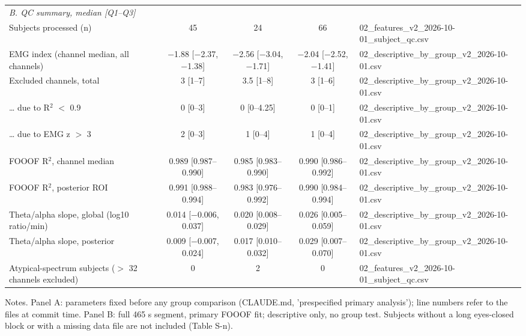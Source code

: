 \begin{table}[htbp]
{\begin{tabular}{p{3.2cm}p{6.5cm}cccl}
\midrule
\multicolumn{6}{l}{\textit{B. QC summary, median [Q1--Q3]}} \\
Subjects processed (n) &  & 45 & 24 & 66 & 02\_features\_v2\_2026-10-01\_subject\_qc.csv \\
EMG index (channel median, all channels) &  & $-$1.88 [$-$2.37, $-$1.38] & $-$2.56 [$-$3.04, $-$1.71] & $-$2.04 [$-$2.52, $-$1.41] & 02\_descriptive\_by\_group\_v2\_2026-10-01.csv \\
Excluded channels, total &  & 3 [1--7] & 3.5 [1--8] & 3 [1--6] & 02\_descriptive\_by\_group\_v2\_2026-10-01.csv \\
\ldots{} due to R$^{2}$ $<$ 0.9 &  & 0 [0--3] & 0 [0--4.25] & 0 [0--1] & 02\_descriptive\_by\_group\_v2\_2026-10-01.csv \\
\ldots{} due to EMG z $>$ 3 &  & 2 [0--3] & 1 [0--4] & 1 [0--4] & 02\_descriptive\_by\_group\_v2\_2026-10-01.csv \\
FOOOF R$^{2}$, channel median &  & 0.989 [0.987--0.990] & 0.985 [0.983--0.990] & 0.990 [0.986--0.992] & 02\_descriptive\_by\_group\_v2\_2026-10-01.csv \\
FOOOF R$^{2}$, posterior ROI &  & 0.991 [0.988--0.994] & 0.983 [0.976--0.992] & 0.990 [0.984--0.994] & 02\_descriptive\_by\_group\_v2\_2026-10-01.csv \\
Theta/alpha slope, global (log10 ratio/min) &  & 0.014 [$-$0.006, 0.037] & 0.020 [0.008--0.029] & 0.026 [0.005--0.059] & 02\_descriptive\_by\_group\_v2\_2026-10-01.csv \\
Theta/alpha slope, posterior &  & 0.009 [$-$0.007, 0.024] & 0.017 [0.010--0.032] & 0.029 [0.007--0.070] & 02\_descriptive\_by\_group\_v2\_2026-10-01.csv \\
Atypical-spectrum subjects ($>$ 32 channels excluded) &  & 0 & 2 & 0 & 02\_features\_v2\_2026-10-01\_subject\_qc.csv \\
\bottomrule
\end{tabular}
}
\par\smallskip
\begin{minipage}{\textwidth}\raggedright\scriptsize
Notes. Panel A: parameters fixed before any group comparison (CLAUDE.md, 'prespecified primary analysis'); line numbers refer to the files at commit time. Panel B: full 465 s segment, primary FOOOF fit; descriptive only, no group test. Subjects without a long eyes-closed block or with a missing data file are not included (Table S-n).
\end{minipage}
\end{table}
